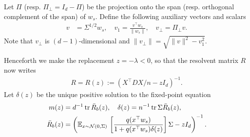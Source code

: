   Let $\Pi$ (resp. $\Pi_\perp=I_d-\Pi$) be the projection onto the span (resp. orthogonal complement of the span) of $w_s$. Define the following auxiliary vectors and scalars
\begin{align}
v &= \Sigma^{1/2}w_s,\quad v_1 = \frac{v^\top w_s}{\|w_s\|},\quad v_\perp = \Pi_\perp v.
\label{eq:projproj}
\end{align}
Note that $v_\perp$ is $(d-1)$-dimensional and $\|v_\perp\| = \sqrt{\|v\|^2-v_1^2}$.

Henceforth we make the replacement $z=-\lambda<0$, so that the resolvent matrix $R$ now writes
\begin{eqnarray}
    R = R(z) := (X^\top D X/n-zI_d)^{-1}.
\end{eqnarray}
 Let $\delta(z)$ be the unique positive solution to the fixed-point equation
\begin{align}
m(z) &= d^{-1}\operatorname{tr}\bar R_b(z),\quad \delta(z) = n^{-1}\operatorname{tr}\Sigma \bar R_b(z),\\
\bar R_b(z) &= \left(\mathbb E_{x \sim \mathcal N(0,\Sigma)}\,\left[\frac{q(x^\top w_s)}{1+q(x^\top w_s)\delta(z)}\right]\Sigma-zI_d\right)^{-1}.
\end{align}


